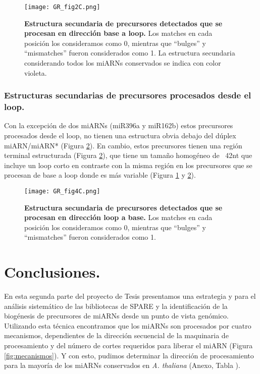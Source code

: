 \begin{figure}[htbp!] 
    \centering    
    \texttt{[image: GR\_fig2C.png]}
    \caption[Estructura secundaria de precursores de base a loop]{
    \textbf{Estructura secundaria de precursores detectados que se procesan en dirección base a loop.}
    Los matches en cada posición los consideramos como 0, mientras que ``bulges'' y ``mismatches'' fueron considerados como 1.
    La estructura secundaria considerando todos los miARNs conservados se indica con color violeta.
    }
    \label{fig:GR_fig2C}
\end{figure}

\subsubsection{Estructuras secundarias de precursores procesados desde el loop.}
Con la excepción de dos miARNs (miR396a y miR162b) estos precursores procesados desde el loop, no tienen una estructura obvia debajo del dúplex miARN/miARN* (Figura \ref{fig:GR_fig4C}).
En cambio, estos precursores tienen una región terminal estructurada (Figura \ref{fig:GR_fig4C}), que tiene un tamaño homogéneo de ~42nt que incluye un loop corto en contraste con la misma región en los precursores que se procesan de base a loop donde es más variable (Figura \ref{fig:GR_fig2C} y \ref{fig:GR_fig4C}). 

\begin{figure}[htbp!] 
    \centering    
    \texttt{[image: GR\_fig4C.png]}
    \caption[Estructura secundaria de precursores de loop a base]{
   \textbf{ Estructura secundaria de precursores detectados que se procesan en dirección loop a base.}
    Los matches en cada posición los consideramos como 0, mientras que ``bulges'' y ``mismatches'' fueron considerados como 1.}
    \label{fig:GR_fig4C}
\end{figure}


\section{Conclusiones.}

En esta segunda parte del proyecto de Tesis presentamos una estrategia y para el análisis sistemático de las bibliotecas de SPARE y la identificación de la biogénesis de precursores de miARNs desde un punto de vista genómico.
Utilizando esta técnica encontramos que los miARNs son procesados por cuatro mecanismos, dependientes de la dirección secuencial de la maquinaria de procesamiento y del número de cortes requeridos para liberar el miARN (Figura \ref{fig:mecanismos}).
Y con esto, pudimos determinar la dirección de procesamiento para la mayoría de los miARNs conservados en \textit{A. thaliana}  (Anexo, Tabla \label{table:mecanismos}).

